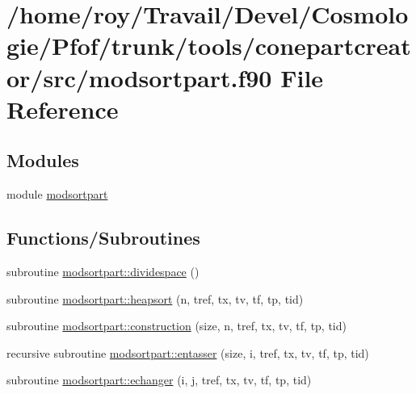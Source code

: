 \hypertarget{conepartcreator_2src_2modsortpart_8f90}{}\section{/home/roy/\+Travail/\+Devel/\+Cosmologie/\+Pfof/trunk/tools/conepartcreator/src/modsortpart.f90 File Reference}
\label{conepartcreator_2src_2modsortpart_8f90}
\subsection*{Modules}
\begin{DoxyCompactItemize}
\item 
module \hyperlink{namespacemodsortpart}{modsortpart}
\end{DoxyCompactItemize}
\subsection*{Functions/\+Subroutines}
\begin{DoxyCompactItemize}
\item 
subroutine \hyperlink{namespacemodsortpart_a45cee800346ecf7b0cdc0c235bd06c48}{modsortpart\+::dividespace} ()
\item 
subroutine \hyperlink{namespacemodsortpart_aa3fa8de94821d20599528fffd223a0b1}{modsortpart\+::heapsort} (n, tref, tx, tv, tf, tp, tid)
\item 
subroutine \hyperlink{namespacemodsortpart_a22ac7a574e86139261a41a3380b63b5a}{modsortpart\+::construction} (size, n, tref, tx, tv, tf, tp, tid)
\item 
recursive subroutine \hyperlink{namespacemodsortpart_a5d085df72d2f718f2b8d37a434a5511d}{modsortpart\+::entasser} (size, i, tref, tx, tv, tf, tp, tid)
\item 
subroutine \hyperlink{namespacemodsortpart_a8c03f207ba984156927802e30e176e56}{modsortpart\+::echanger} (i, j, tref, tx, tv, tf, tp, tid)
\end{DoxyCompactItemize}
